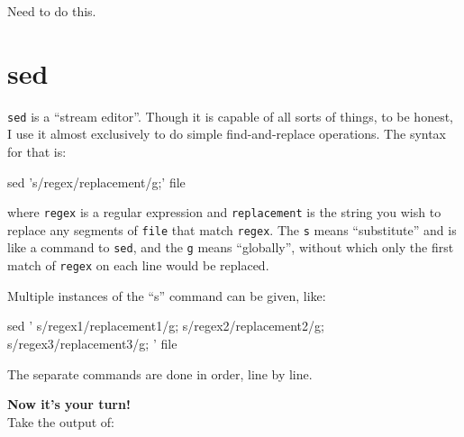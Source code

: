 \documentclass[]{krantz}
\makeatletter
\newenvironment{Shaded}{\begin{snugshade}}{\end{snugshade}}
\newcommand{\BuiltInTok}[1]{#1}
\newcommand{\ExtensionTok}[1]{#1}
\newcommand{\FunctionTok}[1]{\textcolor[rgb]{0,0,0}{#1}}
\newcommand{\KeywordTok}[1]{\textcolor[rgb]{0.27,0.27,0.27}{\textbf{#1}}}
\newcommand{\NormalTok}[1]{#1}
\newcommand{\StringTok}[1]{\textcolor[rgb]{0.5,0.5,0.5}{#1}}
\newcommand{\VariableTok}[1]{\textcolor[rgb]{0,0,0}{#1}}
\newenvironment{kframe}{%
\medskip{}
\setlength{\fboxsep}{.8em}
 \def\at@end@of@kframe{}%
 \ifinner\ifhmode%
  \def\at@end@of@kframe{\end{minipage}}%
  \begin{minipage}{\columnwidth}%
 \fi\fi%
 \def\FrameCommand##1{\hskip\@totalleftmargin \hskip-\fboxsep
 \colorbox{shadecolor}{##1}\hskip-\fboxsep
     \hskip-\linewidth \hskip-\@totalleftmargin \hskip\columnwidth}%
 \MakeFramed {\advance\hsize-\width
   \@totalleftmargin\z@ \linewidth\hsize
   \@setminipage}}%
 {\par\unskip\endMakeFramed%
 \at@end@of@kframe}
\renewenvironment{Shaded}{\begin{kframe}}{\end{kframe}}
\makeatother
\begin{document}
Need to do this.

\hypertarget{sed}{%
\section{sed}\label{sed}}

\texttt{sed} is a ``stream editor''. Though it is capable of all sorts of things,
to be honest, I use it almost exclusively to
do simple find-and-replace operations. The syntax for that is:

\begin{Shaded}
\begin{Highlighting}[]
\FunctionTok{sed} \StringTok{'s/regex/replacement/g;'}\NormalTok{ file}
\end{Highlighting}
\end{Shaded}

where \texttt{regex} is a regular expression and \texttt{replacement} is the string you wish to replace
any segments of \texttt{file} that match \texttt{regex}. The \texttt{s} means ``substitute'' and is like
a command to \texttt{sed}, and the \texttt{g} means ``globally'', without which only the first
match of \texttt{regex} on each line would be replaced.

Multiple instances of the ``s'' command can be given, like:

\begin{Shaded}
\begin{Highlighting}[]
\FunctionTok{sed} \StringTok{'}
\StringTok{  s/regex1/replacement1/g;}
\StringTok{  s/regex2/replacement2/g;}
\StringTok{  s/regex3/replacement3/g;}
\StringTok{'}\NormalTok{ file}
\end{Highlighting}
\end{Shaded}

The separate commands are done in order, line by line.

\textbf{Now it's your turn!}\\
Take the output of:

\begin{Shaded}
\end{Shaded}
\end{document}
